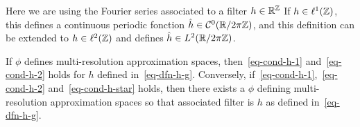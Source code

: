 Here we are using the Fourier series associated to a filter $h \in \mathbb{R}^{\mathbb{Z}}$
If $h \in \ell^1(\mathbb{Z})$, this defines a continuous periodic fonction $\hat h \in \mathcal{C}^0(\mathbb{R}/2\pi\mathbb{Z})$, and this definition can be extended to $h \in \ell^2(\mathbb{Z})$ and defines $\hat h \in L^2(\mathbb{R}/2\pi\mathbb{Z})$.

\begin{thm}\label{thm-multires-approx}
	If $\phi$ defines multi-resolution approximation spaces, then~\eqref{eq-cond-h-1} and~\eqref{eq-cond-h-2} holds for $h$ defined in~\eqref{eq-dfn-h-g}.
	Conversely, if~\eqref{eq-cond-h-1},~\eqref{eq-cond-h-2} and~\eqref{eq-cond-h-star} holds, then there exists a $\phi$ defining multi-resolution approximation spaces so that associated filter is $h$ as defined in~\eqref{eq-dfn-h-g}.
\end{thm}

